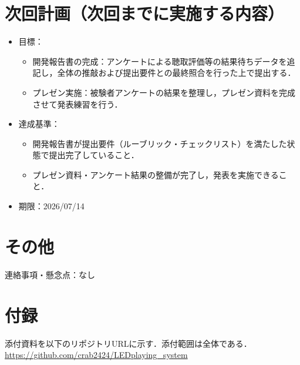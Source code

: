 \documentclass[lualatex,paper=a4paper,jafontsize=11.5pt,jafontscale=1.05]{jlreq}
\begin{document}
\section{次回計画（次回までに実施する内容）}
\begin{itemize}
  \item 目標：
  \begin{itemize}
    \item 開発報告書の完成：アンケートによる聴取評価等の結果待ちデータを追記し，全体の推敲および提出要件との最終照合を行った上で提出する．
    \item プレゼン実施：被験者アンケートの結果を整理し，プレゼン資料を完成させて発表練習を行う．
  \end{itemize}
  \item 達成基準：
  \begin{itemize}
    \item 開発報告書が提出要件（ルーブリック・チェックリスト）を満たした状態で提出完了していること．
    \item プレゼン資料・アンケート結果の整備が完了し，発表を実施できること．
  \end{itemize}
  \item 期限：2026/07/14
\end{itemize}

\section{その他}
連絡事項・懸念点：なし

\section{付録}
添付資料を以下のリポジトリURLに示す．添付範囲は全体である．\\
\url{https://github.com/crab2424/LEDplaying_system}

\end{document}
